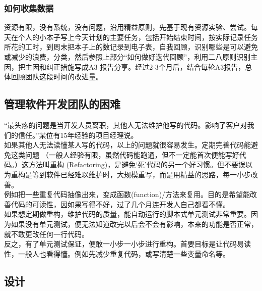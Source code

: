 \hypertarget{ux5982ux4f55ux6536ux96c6ux6570ux636e}{%
\subsubsection{如何收集数据}\label{ux5982ux4f55ux6536ux96c6ux6570ux636e}}

资源有限，没有系统，没有问题，沿用精益原则，先基于现有资源实验、尝试。每天在个人的小本子写上今天计划的主要任务，包括开始结束时间，按实际记录任务所花的工时，到周末把本子上的数记录到电子表，自我回顾，识别哪些是可以避免或减少的浪费，分类，然后参照上部分``如何做好迭代回顾''，利用二八原则识别主因，把主因和纠正措施写成A3
报告分享。经过2-3个月后，结合每轮A3报告，总体回顾团队这段时间的改进量。\\

\hypertarget{ux7ba1ux7406ux8f6fux4ef6ux5f00ux53d1ux56e2ux961fux7684ux56f0ux96be}{%
\subsection{管理软件开发团队的困难}\label{ux7ba1ux7406ux8f6fux4ef6ux5f00ux53d1ux56e2ux961fux7684ux56f0ux96be}}

``最头疼的问题是当开发人员离职，其他人无法维护他写的代码。影响了客户对我们的信任。''某位有15年经验的项目经理说。\\
如果其他人无法读懂某人写的代码，以上的问题就很容易发生。定期完善代码能避免这类问题
（一般人经验有限，虽然代码能跑通，但不一定能首次便能写好代码。）这方法叫重构
(Refactoring)，是避免`死'代码的另一个好习惯。但不要误以为重构是等到软件已经难以维护时，大规模重写，而是用精益的思路，每一小步改善。\\
例如把一些重复代码抽像出来，变成函数(function)/方法来复用。目的是希望能改善代码的可读性，因如果写得不好，过了几个月连开发人自己都看不懂。\\
如果想定期做重构，维护代码的质量，能自动运行的脚本式单元测试非常重要。因为如果没有单元测试，便无法知道改完以后会不会有影响，本来的功能是否正常，就不敢更改任何一行代码。\\
反之，有了单元测试保证，便敢一小步一小步进行重构。首要目标是让代码易读性，一般人也看得懂。例如先减少重复代码，或写清楚一些变量命名等。

\hypertarget{ux8bbeux8ba1}{%
\subsection{设计}\label{ux8bbeux8ba1}}

